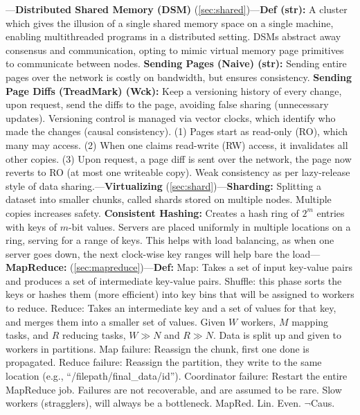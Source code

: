 \begin{multicols}{2}

\noindent
---\textbf{Distributed Shared Memory (DSM)} (\ref{sec:shared})---\textbf{Def (str):} A cluster which gives the 
illusion of a single shared memory space on a single machine, enabling multithreaded programs in a 
distributed setting. DSMs abstract away consensus and communication, opting to mimic virtual memory page primitives 
to communicate between nodes. \textbf{Sending Pages (Naive) (str):} Sending entire pages over the network is costly on bandwidth, but ensures consistency.
\textbf{Sending Page Diffs (TreadMark) (Wck):} Keep a versioning history of every change, upon request, send the diffs to the page, avoiding false sharing (unnecessary updates).
Versioning control is managed via vector clocks, which identify who made the changes (causal consistency). (1) Pages start as read-only (RO), which
many may access. (2) When one claims read-write (RW) access, it invalidates all other copies. (3) Upon request, a page diff is sent over the network,
the page now reverts to RO (at most one writeable copy). Weak consistency as per lazy-release style of data
sharing.---\textbf{Virtualizing} (\ref{sec:shard})---\textbf{Sharding:} Splitting a dataset into smaller chunks, called shards stored on multiple nodes. Multiple copies increases
safety. \textbf{Consistent Hashing:} Creates a hash ring of $2^m$ entries with keys of $m$-bit values. Servers 
are placed uniformly in multiple locations on a ring, serving for a range of
keys.
This helps with load balancing, as when one server goes down, the next clock-wise key ranges will help bare the load---\textbf{MapReduce:} (\ref{sec:mapreduce})---\textbf{Def:} Map: Takes a set of input key-value pairs and produces a set of intermediate key-value
pairs. Shuffle: this phase sorts the keys or hashes them (more efficient) into key bins that will be assigned to workers to reduce. Reduce: Takes an intermediate key and a set of values for that key, and merges them
into a smaller set of values. Given $W$ workers, $M$ mapping tasks, and $R$ reducing tasks, $W \gg N$ and $R \gg N$.  Data is split up and given 
to workers in partitions.
Map failure: Reassign the chunk, first one done is propagated. 
Reduce failure: Reassign the partition, they write to the same location (e.g., ``/filepath/final\_data/id'').
Coordinator failure: Restart the entire MapReduce job. Failures are not recoverable, and are assumed to be rare.
Slow workers (stragglers), will always be a bottleneck.
MapRed. Lin. Even. $\neg$Caus.



\end{multicols}
